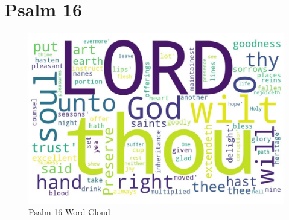 \chapter{Psalm 16}

\begin{figure}
  \includegraphics[width=\linewidth]{19OT-Psalms/Psalm16-WordCloud.jpg}
  \caption{Psalm 16 Word Cloud}
  \label{fig:Psalm 16 word Cloud}
\end{figure}



